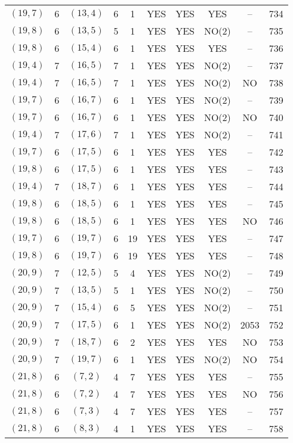 \begin{longtable}{|c|c|c|c|c|c|c|c|c|c|}
$(19, 7)$ & 6 & $(13, 4)$ & 6 & 1 & YES & YES & YES & -- & 734\\
$(19, 8)$ & 6 & $(13, 5)$ & 5 & 1 & YES & YES & NO(2) & -- & 735\\
$(19, 8)$ & 6 & $(15, 4)$ & 6 & 1 & YES & YES & YES & -- & 736\\
$(19, 4)$ & 7 & $(16, 5)$ & 7 & 1 & YES & YES & NO(2) & -- & 737\\
$(19, 4)$ & 7 & $(16, 5)$ & 7 & 1 & YES & YES & NO(2) & NO & 738\\
$(19, 7)$ & 6 & $(16, 7)$ & 6 & 1 & YES & YES & NO(2) & -- & 739\\
$(19, 7)$ & 6 & $(16, 7)$ & 6 & 1 & YES & YES & NO(2) & NO & 740\\
$(19, 4)$ & 7 & $(17, 6)$ & 7 & 1 & YES & YES & NO(2) & -- & 741\\
$(19, 7)$ & 6 & $(17, 5)$ & 6 & 1 & YES & YES & YES & -- & 742\\
$(19, 8)$ & 6 & $(17, 5)$ & 6 & 1 & YES & YES & YES & -- & 743\\
$(19, 4)$ & 7 & $(18, 7)$ & 6 & 1 & YES & YES & YES & -- & 744\\
$(19, 8)$ & 6 & $(18, 5)$ & 6 & 1 & YES & YES & YES & -- & 745\\
$(19, 8)$ & 6 & $(18, 5)$ & 6 & 1 & YES & YES & YES & NO & 746\\
$(19, 7)$ & 6 & $(19, 7)$ & 6 & 19 & YES & YES & YES & -- & 747\\
$(19, 8)$ & 6 & $(19, 7)$ & 6 & 19 & YES & YES & YES & -- & 748\\
$(20, 9)$ & 7 & $(12, 5)$ & 5 & 4 & YES & YES & NO(2) & -- & 749\\
$(20, 9)$ & 7 & $(13, 5)$ & 5 & 1 & YES & YES & NO(2) & -- & 750\\
$(20, 9)$ & 7 & $(15, 4)$ & 6 & 5 & YES & YES & NO(2) & -- & 751\\
$(20, 9)$ & 7 & $(17, 5)$ & 6 & 1 & YES & YES & NO(2) & 2053 & 752\\
$(20, 9)$ & 7 & $(18, 7)$ & 6 & 2 & YES & YES & YES & NO & 753\\
$(20, 9)$ & 7 & $(19, 7)$ & 6 & 1 & YES & YES & NO(2) & NO & 754\\
$(21, 8)$ & 6 & $(7, 2)$ & 4 & 7 & YES & YES & YES & -- & 755\\
$(21, 8)$ & 6 & $(7, 2)$ & 4 & 7 & YES & YES & YES & NO & 756\\
$(21, 8)$ & 6 & $(7, 3)$ & 4 & 7 & YES & YES & YES & -- & 757\\
$(21, 8)$ & 6 & $(8, 3)$ & 4 & 1 & YES & YES & YES & -- & 758\\

\end{longtable}
